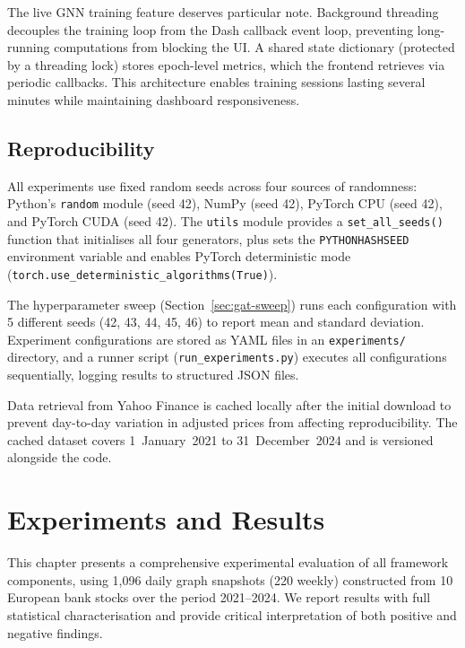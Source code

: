 The live GNN training feature deserves particular note. Background threading decouples the training loop from the Dash callback event loop, preventing long-running computations from blocking the UI. A shared state dictionary (protected by a threading lock) stores epoch-level metrics, which the frontend retrieves via periodic callbacks. This architecture enables training sessions lasting several minutes while maintaining dashboard responsiveness.


\section{Reproducibility}
\label{sec:reproducibility}

All experiments use fixed random seeds across four sources of randomness: Python's \texttt{random} module (seed 42), NumPy (seed 42), PyTorch CPU (seed 42), and PyTorch CUDA (seed 42). The \texttt{utils} module provides a \texttt{set\_all\_seeds()} function that initialises all four generators, plus sets the \texttt{PYTHONHASHSEED} environment variable and enables PyTorch deterministic mode (\texttt{torch.use\_deterministic\_algorithms(True)}).

The hyperparameter sweep (Section~\ref{sec:gat-sweep}) runs each configuration with 5 different seeds (42, 43, 44, 45, 46) to report mean and standard deviation. Experiment configurations are stored as YAML files in an \texttt{experiments/} directory, and a runner script (\texttt{run\_experiments.py}) executes all configurations sequentially, logging results to structured JSON files.

Data retrieval from Yahoo Finance is cached locally after the initial download to prevent day-to-day variation in adjusted prices from affecting reproducibility. The cached dataset covers 1~January~2021 to 31~December~2024 and is versioned alongside the code.


\chapter{Experiments and Results}
\label{ch:results}

This chapter presents a comprehensive experimental evaluation of all framework components, using 1,096 daily graph snapshots (220 weekly) constructed from 10 European bank stocks over the period 2021--2024. We report results with full statistical characterisation and provide critical interpretation of both positive and negative findings.


